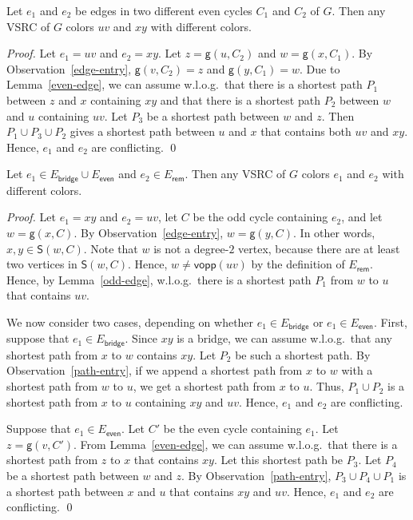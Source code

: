 \documentclass[letter,runningheads,envcountsame,envcountsect]{llncs}
\newcommand{\cvsrc}{VSRC}
\newcommand{\et}{E_{\mathsf{bridge}}}
\newcommand{\eeven}{E_{\mathsf{even}}}
\newcommand{\erem}{E_{\mathsf{rem}}}
\newcommand{\vopp}{\mathsf{vopp}}
\newcommand{\g}{\mathsf{g}}
\newcommand{\subg}{\mathsf{S}}
\begin{document}
\begin{lemma}
	\label{even-even}
	Let $e_1$ and $e_2$ be edges in two different even cycles $C_1$ and $C_2$ of $G$. 
	Then any {\cvsrc} of $G$ colors $uv$ and $xy$ with different colors.
\end{lemma}
\begin{proof}
Let $e_1 = uv$ and $e_2 = xy$.
	Let $z=\g(u,C_2)$ and $w=\g(x,C_1)$.
	By Observation~\ref{edge-entry}, $\g(v,C_2)=z$ and $\g(y,C_1)=w$.
	Due to Lemma~\ref{even-edge}, we can assume w.l.o.g.\ that there is a shortest path $P_1$ between $z$ and $x$ containing $xy$ and that there is a shortest path $P_2$ between $w$ and $u$ containing $uv$.
	Let $P_3$ be a shortest path between $w$ and $z$.
	Then $P_1\cup P_3 \cup P_2$ gives a shortest path between $u$ and $x$ that contains both $uv$ and $xy$.
	Hence, $e_1$ and $e_2$ are conflicting.
\qed\end{proof}


\begin{lemma} \label{erem-no-repeat}
Let $e_1\in \et\cup \eeven$ and $e_2\in \erem$. Then any {\cvsrc} of $G$ colors $e_1$ and $e_2$ with different colors.
\end{lemma}
\begin{proof}
Let $e_1=xy$ and $e_2=uv$, let $C$ be the odd cycle containing $e_2$, and let $w=\g(x,C)$. By Observation~\ref{edge-entry}, $w=\g(y,C)$. In other words, $x,y\in \subg(w,C)$. Note that $w$ is not a degree-$2$ vertex, because there are at least two vertices in $\subg(w,C)$.	Hence, $w\neq \vopp(uv)$ by the definition of $\erem$. Hence, by Lemma~\ref{odd-edge}, w.l.o.g.\ there is a shortest path $P_1$ from $w$ to $u$ that contains $uv$.

We now consider two cases, depending on whether $e_1 \in \et$ or $e_1 \in \eeven$. First, suppose that $e_1\in \et$. Since $xy$ is a bridge, we can assume w.l.o.g.\ that any shortest path from $x$ to $w$ contains $xy$. Let $P_2$ be such a shortest path. By Observation~\ref{path-entry}, if we append a shortest path from $x$ to $w$ with a shortest path from $w$ to $u$, we get a shortest path from $x$ to $u$. Thus, $P_1\cup P_2$ is a shortest path from $x$ to $u$ containing $xy$ and $uv$. Hence, $e_1$ and $e_2$ are conflicting.

Suppose that $e_1\in \eeven$. Let $C'$ be the even cycle containing $e_1$.
Let $z=\g(v,C')$.
	From Lemma~\ref{even-edge}, we can assume w.l.o.g.\ that there is a shortest path from $z$ to $x$ that contains $xy$.
	Let this shortest path be $P_3$.
Let $P_4$ be a shortest path between $w$ and $z$.
By Observation~\ref{path-entry}, $P_3\cup P_4\cup P_1$ is a shortest path between $x$ and $u$ that contains $xy$ and $uv$. Hence, $e_1$ and $e_2$ are conflicting.
\qed\end{proof}
\end{document}
